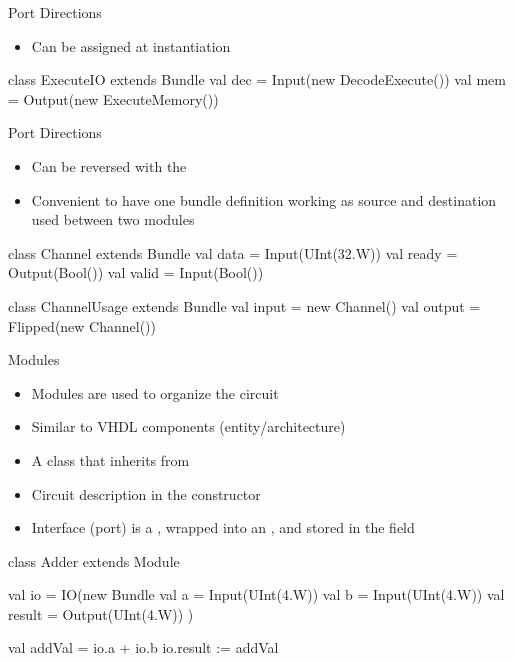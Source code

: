 \begin{frame}[fragile]{Port Directions}
\begin{itemize}
\item Can be assigned at instantiation
\end{itemize}
\begin{chisel}
class ExecuteIO extends Bundle {
  val dec = Input(new DecodeExecute())
  val mem = Output(new ExecuteMemory())
}
\end{chisel}
\begin{chisel}
\end{chisel}
\end{frame}

\begin{frame}[fragile]{Port Directions}
\begin{itemize}
\item Can be reversed with the 
\item Convenient to have one bundle definition working as source
and destination used between two modules
\end{itemize}
\begin{chisel}
class Channel extends Bundle {
  val data = Input(UInt(32.W))
  val ready = Output(Bool())
  val valid = Input(Bool())
}

class ChannelUsage extends Bundle {
  val input = new Channel()
  val output = Flipped(new Channel())
}
\end{chisel}
\end{frame}

\begin{frame}[fragile]{Modules}
\begin{itemize}
\item Modules are used to organize the circuit
\item Similar to VHDL components (entity/architecture)
\item A class that inherits from 
\item Circuit description in the constructor
\item Interface (port) is a , wrapped into an , and stored in the field 
\end{itemize}
\begin{chisel}
class Adder extends Module {
  val io = IO(new Bundle {
    val a = Input(UInt(4.W))
    val b = Input(UInt(4.W))
    val result = Output(UInt(4.W))
  })

  val addVal = io.a + io.b
  io.result := addVal
}
\end{chisel}
\end{frame}

